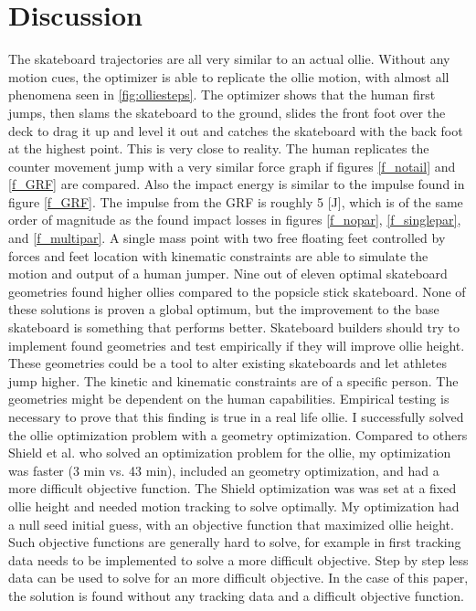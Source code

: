 \documentclass[default,iicol]{sn-jnl}
\begin{document}
\section{Discussion}
\noindent The skateboard trajectories are all very similar to an actual ollie. Without any motion cues, the optimizer is able to replicate the ollie motion, with almost all phenomena seen in \ref{fig:olliesteps}. The optimizer shows that the human first jumps, then slams the skateboard to the ground, slides the front foot over the deck to drag it up and level it out and catches the skateboard with the back foot at the highest point. This is very close to reality. The human replicates the counter movement jump with a very similar force graph if figures \ref{f_notail} and \ref{f_GRF} are compared. Also the impact energy is similar to the impulse found in figure \ref{f_GRF}. The impulse from the GRF is roughly 5 [J], which is of the same order of magnitude as the found impact losses in figures \ref{f_nopar}, \ref{f_singlepar}, and \ref{f_multipar}.
A single mass point with two free floating feet controlled by forces and feet location with kinematic constraints are able to simulate the motion and output of a human jumper. 
Nine out of eleven optimal skateboard geometries found higher ollies compared to the popsicle stick skateboard. None of these solutions is proven a global optimum, but the improvement to the base skateboard is something that performs better. Skateboard builders should try to implement found geometries and test empirically if they will improve ollie height. These geometries could be a tool to alter existing skateboards and let athletes jump higher. The kinetic and kinematic constraints are of a specific person. The geometries might be dependent on the human capabilities. Empirical testing is necessary to prove that this finding is true in a real life ollie. I successfully solved the ollie optimization problem with a geometry optimization. Compared to others Shield et al. \cite{shield_contact-implicit_2022} who solved an optimization problem for the ollie, my optimization was faster (3 min vs. 43 min), included an geometry optimization, and had a more difficult objective function. The Shield optimization was was set at a fixed ollie height and needed motion tracking to solve optimally. My optimization had a null seed initial guess, with an objective function that maximized ollie height. Such objective functions are generally hard to solve, for example in \cite{nitschke_efficient_2020} first tracking data needs to be implemented to solve a more difficult objective. Step by step less data can be used to solve for an more difficult objective. In the case of this paper, the solution is found without any tracking data and a difficult objective function. 
\end{document}
